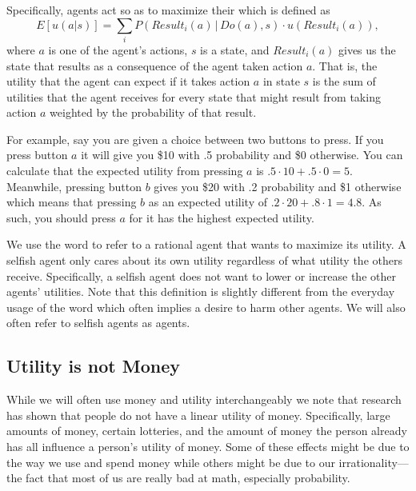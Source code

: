 Specifically, agents act so as to maximize their 
which is defined as
\begin{equation}
  \label{eq:1}
  E[u(a|s)] = \sum_i P(Result_i(a)\,|\,Do(a),s) \cdot u(Result_i(a)),
\end{equation}
where $a$ is one of the agent's actions, $s$ is a state, and
$Result_i(a)$ gives us the state that results as a consequence of the
agent taken action $a$. That is, the utility that the agent can expect
if it takes action $a$ in state $s$ is the sum of utilities that the
agent receives for every state that might result from taking action
$a$ weighted by the probability of that result. 

For example, say you are given a choice between two buttons to press.
If you press button $a$ it will give you \$10 with .5 probability and
\$0 otherwise. You can calculate that the expected utility from
pressing $a$ is $.5\cdot10 + .5\cdot0 = 5$. Meanwhile, pressing button
$b$ gives you \$20 with .2 probability and \$1 otherwise which means
that pressing $b$ as an expected utility of $.2\cdot20 + .8\cdot1 =
4.8$. As such, you should press $a$ for it has the highest expected
utility.

We use the word  to refer to a rational agent that wants
to maximize its utility. A selfish agent only cares about its own
utility regardless of what utility the others receive. Specifically, a
selfish agent does not want to lower or increase the other agents'
utilities. Note that this definition is slightly different from the
everyday usage of the word which often implies a desire to harm other
agents. We will also often refer to selfish agents as 
agents.


\subsection{Utility is not Money}
\label{sec:utility-not-money}

While we will often use money and utility interchangeably we note that
research has shown that people do not have a linear utility of money.
Specifically, large amounts of money, certain lotteries, and the
amount of money the person already has all influence a person's
utility of money. Some of these effects might be due to the way we use
and spend money while others might be due to our irrationality---the
fact that most of us are really bad at math, especially probability.

